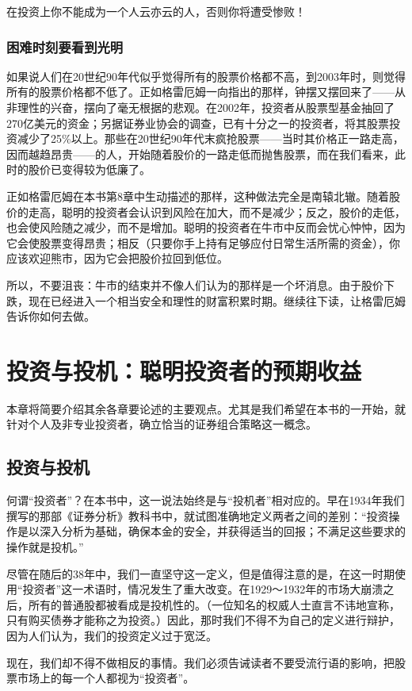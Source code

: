 \documentclass[12pt,oneside]{book}
\begin{document}
在投资上你不能成为一个人云亦云的人，否则你将遭受惨败！



\subsection{困难时刻要看到光明}
如果说人们在20世纪90年代似乎觉得所有的股票价格都不高，到2003年时，则觉得所有的股票价格都不低了。正如格雷厄姆一向指出的那样，钟摆又摆回来了——从非理性的兴奋，摆向了毫无根据的悲观。在2002年，投资者从股票型基金抽回了270亿美元的资金；另据证券业协会的调查，已有十分之一的投资者，将其股票投资减少了25\%以上。那些在20世纪90年代末疯抢股票——当时其价格正一路走高，因而越趋昂贵——的人，开始随着股价的一路走低而抛售股票，而在我们看来，此时的股价已变得较为低廉了。

正如格雷厄姆在本书第8章中生动描述的那样，这种做法完全是南辕北辙。随着股价的走高，聪明的投资者会认识到风险在加大，而不是减少；反之，股价的走低，也会使风险随之减少，而不是增加。聪明的投资者在牛市中反而会忧心忡忡，因为它会使股票变得昂贵；相反（只要你手上持有足够应付日常生活所需的资金），你应该欢迎熊市，因为它会把股价拉回到低位。

所以，不要沮丧：牛市的结束并不像人们认为的那样是一个坏消息。由于股价下跌，现在已经进入一个相当安全和理性的财富积累时期。继续往下读，让格雷厄姆告诉你如何去做。


\chapter{投资与投机：聪明投资者的预期收益}
本章将简要介绍其余各章要论述的主要观点。尤其是我们希望在本书的一开始，就针对个人及非专业投资者，确立恰当的证券组合策略这一概念。

\section{投资与投机}
何谓“投资者”？在本书中，这一说法始终是与“投机者”相对应的。早在1934年我们撰写的那部《证券分析》教科书中，就试图准确地定义两者之间的差别：“投资操作是以深入分析为基础，确保本金的安全，并获得适当的回报；不满足这些要求的操作就是投机。”

尽管在随后的38年中，我们一直坚守这一定义，但是值得注意的是，在这一时期使用“投资者”这一术语时，情况发生了重大改变。在1929～1932年的市场大崩溃之后，所有的普通股都被看成是投机性的。（一位知名的权威人士直言不讳地宣称，只有购买债券才能称之为投资。）因此，那时我们不得不为自己的定义进行辩护，因为人们认为，我们的投资定义过于宽泛。

现在，我们却不得不做相反的事情。我们必须告诫读者不要受流行语的影响，把股票市场上的每一个人都视为“投资者”。
\end{document}
